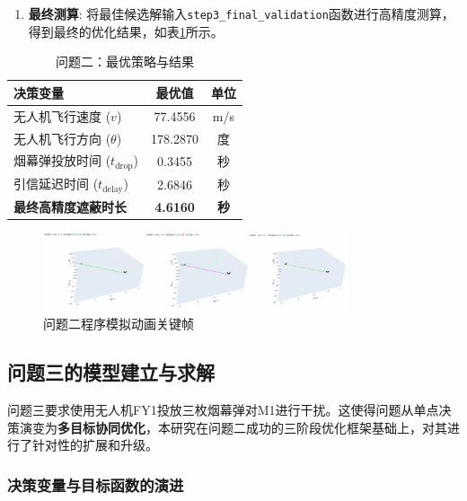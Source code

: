 \documentclass[12pt]{article}
\newcommand{\code}[1]{\texttt{#1}} %
\begin{document}
\begin{CJK}{UTF8}{gbsn}
\begin{enumerate}
			\item \textbf{最终测算}: 将最佳候选解输入\code{step3\_final\_validation}函数进行高精度测算，得到最终的优化结果，如表\ref{tab:results_q2}所示。
		\end{enumerate}
		
		\begin{table}[H]
			\centering
			\caption{问题二：最优策略与结果}
			\label{tab:results_q2}
			\begin{tabular}{@{}lcc@{}}
				\toprule
				决策变量               & 最优值      & 单位 \\ \midrule
				无人机飞行速度 ($v$)     & 77.4556 & m/s  \\
				无人机飞行方向 ($\theta$)    & 178.2870  & 度   \\
				烟幕弹投放时间 ($t_{\text{drop}}$) & 0.3455 & 秒   \\
				引信延迟时间 ($t_{\text{delay}}$)   & 2.6846 & 秒   \\ \midrule
				\textbf{最终高精度遮蔽时长} & \textbf{4.6160} & \textbf{秒}   \\ \bottomrule
			\end{tabular}
		\end{table}
		
		\begin{figure}[H]
			\centering
			\includegraphics[width=0.8\textwidth]{pic/sim2.jpg}
			\caption{问题二程序模拟动画关键帧}
			\label{fig:simulation_q2}
		\end{figure}
		
		\subsection{问题三的模型建立与求解}
		
		问题三要求使用无人机FY1投放三枚烟幕弹对M1进行干扰。这使得问题从单点决策演变为\textbf{多目标协同优化}，本研究在问题二成功的三阶段优化框架基础上，对其进行了针对性的扩展和升级。
		
		\subsubsection{决策变量与目标函数的演进}
		

\end{CJK}
\end{document}
